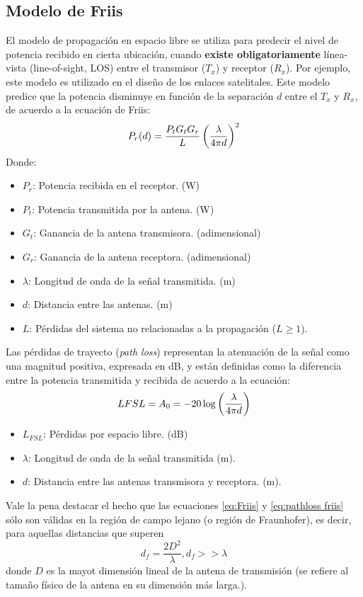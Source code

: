 \documentclass[
	12pt, %
	fleqn, %
	a4paper, %
	oneside, %
]{LegrandOrangeBook}
\begin{document}
\subsection{Modelo de Friis}\label{sec:modelo friis}
El modelo de propagación en espacio libre se utiliza para predecir el nivel de potencia recibido en cierta ubicación, cuando \textbf{existe obligatoriamente} línea-vista (line-of-sight, LOS) entre el transmisor ($T_x$) y receptor ($R_x$). Por ejemplo, este modelo es utilizado en el diseño de los enlaces satelitales. Este modelo predice que la potencia disminuye en función de la separación $d$ entre el $T_x$ y $R_x$, de acuerdo a la ecuación de Friis:
\begin{equation}
P_r(d)=\frac{P_tG_tG_r}{L}\left(\frac{\lambda}{4\pi d}\right)^2
\label{eq:Friis}
\end{equation}
Donde:
\begin{itemize}
\item $P_r$: Potencia recibida en el receptor. (W)
\item $P_t$: Potencia transmitida por la antena. (W)
\item $G_t$: Ganancia de la antena transmisora. (adimensional)
\item $G_r$: Ganancia de la antena receptora. (adimensional)
\item $\lambda$: Longitud de onda de la señal transmitida. (m)
\item $d$: Distancia entre las antenas. (m)
\item $L$: Pérdidas del sistema no relacionadas a la propagación ($L\geq 1$).
\end{itemize}
Las pérdidas de trayecto (\textit{path loss}) representan la atenuación de la señal como una magnitud positiva, expresada en dB, y están definidas como la diferencia entre la potencia transmitida y recibida de acuerdo a la ecuación:
\begin{equation}
L{FSL}=A_0=-20\log\left(\frac{\lambda}{4\pi d}\right)
\label{eq:pathloss friis}
\end{equation}
\begin{itemize}
\item $L_{FSL}$: Pérdidas por espacio libre. (dB)
\item $\lambda$: Longitud de onda de la señal transmitida (m).
\item $d$: Distancia entre las antenas transmisora y receptora. (m).
\end{itemize}
\begin{notation}
Vale la pena destacar el hecho que las ecuaciones \ref{eq:Friis} y \ref{eq:pathloss friis} sólo son válidas en la región de campo lejano (o región de Fraunhofer), es decir, para aquellas distancias que superen
\begin{displaymath}
d_f=\frac{2D^2}{\lambda},d_f>>\lambda
\end{displaymath}
donde $D$ es la mayot dimensión lineal de la antena de transmisión (se refiere al tamaño físico de la antena en su dimensión más larga.).
\end{notation}
\end{document}
